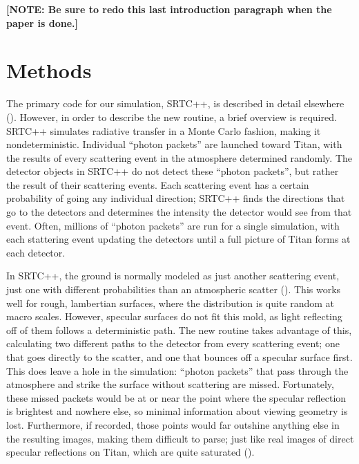\documentclass[linenumbers]{aastex631}
\begin{document}
\textbf{\color{red} [NOTE: Be sure to redo this last introduction paragraph when the paper is done.] \color{black}}

\section{Methods}
The primary code for our simulation, SRTC++, is described in detail elsewhere (\cite{Barnes2018}). However, in order to describe the new routine, a brief overview is required. SRTC++ simulates radiative transfer in a Monte Carlo fashion, making it nondeterministic. Individual ``photon packets'' are launched toward Titan, with the results of every scattering event in the atmosphere determined randomly. The detector objects in SRTC++ do not detect these ``photon packets'', but rather the result of their scattering events. Each scattering event has a certain probability of going any individual direction; SRTC++ finds the directions that go to the detectors and determines the intensity the detector would see from that event. Often, millions of ``photon packets'' are run for a single simulation, with each stattering event updating the detectors until a full picture of Titan forms at each detector.

In SRTC++, the ground is normally modeled as just another scattering event, just one with different probabilities than an atmospheric scatter (\cite{Barnes2018}). This works well for rough, lambertian surfaces, where the distribution is quite random at macro scales. However, specular surfaces do not fit this mold, as light reflecting off of them follows a deterministic path.  The new routine takes advantage of this, calculating two different paths to the detector from every scattering event; one that goes directly to the scatter, and one that bounces off a specular surface first. This does leave a hole in the simulation: ``photon packets'' that pass through the atmosphere and strike the surface without scattering are missed. Fortunately, these missed packets would be at or near the point where the specular reflection is brightest and nowhere else, so minimal information about viewing geometry is lost. Furthermore, if recorded, those points would far outshine anything else in the resulting images, making them difficult to parse; just like real images of direct specular reflections on Titan, which are quite saturated (\cite{Barnes2013}).
\end{document}
